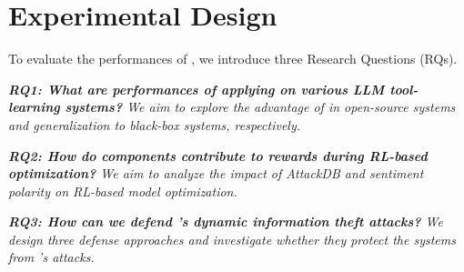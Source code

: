 \section{Experimental Design}\label{sec:data_preparation}
To evaluate the performances of {\tool}, we introduce three Research Questions (RQs).







\textit{\textbf{RQ1: What are performances of applying {\tool} on various LLM tool-learning systems?}
{
We aim to explore the advantage of {\tool} in open-source systems and generalization to black-box systems, respectively.
}
}


\textit{\textbf{RQ2: How do components contribute to rewards during RL-based optimization?}
We aim to analyze the impact of AttackDB and sentiment polarity on {RL-based model} optimization.}

\textit{\textbf{RQ3: How can we defend {\tool}'s dynamic information theft attacks?}
{
We design three defense approaches and investigate whether they protect the systems from {\tool}'s attacks.
}
}




